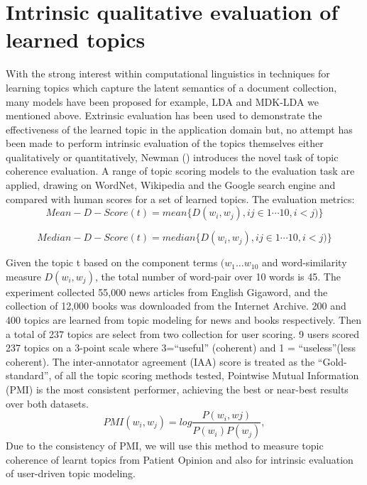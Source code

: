 \documentclass[11pt,twoside]{report}
\begin{document}
\section{Intrinsic qualitative evaluation of learned topics}
With the strong interest within computational linguistics in techniques for learning topics which capture the latent semantics of a document collection, many models have been proposed for example, LDA and MDK-LDA we mentioned above. Extrinsic evaluation has been used to demonstrate the effectiveness of the learned topic in the application domain but, no attempt has been made to perform intrinsic evaluation of the topics themselves either qualitatively or quantitatively, Newman (\cite{ref27}) introduces the novel task of topic coherence evaluation. A range of topic scoring models to the evaluation task are applied, drawing on WordNet, Wikipedia and the Google search engine and compared with human scores for a set of learned topics. The evaluation metrics:
\begin{equation}
Mean-D-Score(t) =  mean\{D(w_{i}, w_{j}), ij\in 1\cdots 10, i<j)\}
\end{equation}

\begin{equation}
Median-D-Score(t) =  median\{D(w_{i}, w_{j}), ij\in 1\cdots 10, i<j)\}
\end{equation}

Given the topic t based on the component terms $(w_{1}…w_{10}$ and word-similarity measure $D(w_{i}, w_{j})$, the total number of word-pair over 10 words is 45. The experiment collected 55,000 news articles from English Gigaword, and the collection of 12,000 books was downloaded from the Internet Archive. 200 and 400 topics are learned from topic modeling for news and books respectively. Then a total of 237 topics are select from two collection for user scoring. 9 users scored 237 topics on a 3-point scale where 3=``useful'' (coherent) and 1 = ``useless''(less coherent). The inter-annotator agreement (IAA) score is treated as the ``Gold-standard'', of all the topic scoring methods tested, Pointwise Mutual Information (PMI) is the most consistent performer, achieving the best or near-best results over both datasets. 
\begin{equation}
PMI(w_{i}, w_{j}) = log \frac{P(w_{i}, w{j})}{P(w_{i})P(w_{j})},
\end{equation}
Due to the consistency of PMI, we will use this method to measure topic coherence of learnt topics from Patient Opinion and also for intrinsic evaluation of user-driven topic modeling.
\end{document}
